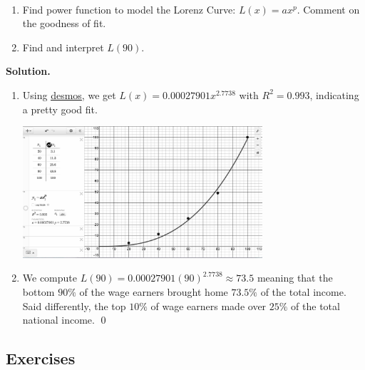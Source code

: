 \documentclass{ximera}
\begin{document}
\begin{ex} \label{LorenzEx}  $~$

\begin{enumerate}

\item Find power function to model the Lorenz Curve: $L(x) = ax^p$.  Comment on the goodness of fit.  

\item Find and interpret $L(90)$.

\end{enumerate}

{\bf Solution.}  

\begin{enumerate}

\item Using \href{https://www.desmos.com/}{\underline{desmos}}, we get $L(x) = 0.00027901x^{2.7738}$ with $R^2 = 0.993$, indicating a pretty good fit.  

\begin{center}

\includegraphics[width=3.5in]{./PowerFunctionsGraphics/LorenzEx.jpg}

\end{center}


\item We compute $L(90) = 0.00027901(90)^{2.7738} \approx 73.5$ meaning that the bottom $90 \%$ of the wage earners brought home $73.5 \%$ of the total income.  Said differently, the top $10 \%$ of wage earners made over $25 \%$ of the total national income.  \qed


\end{enumerate}


 
\end{ex}

\newpage

\subsection{Exercises}


\closegraphsfile
\end{document}
